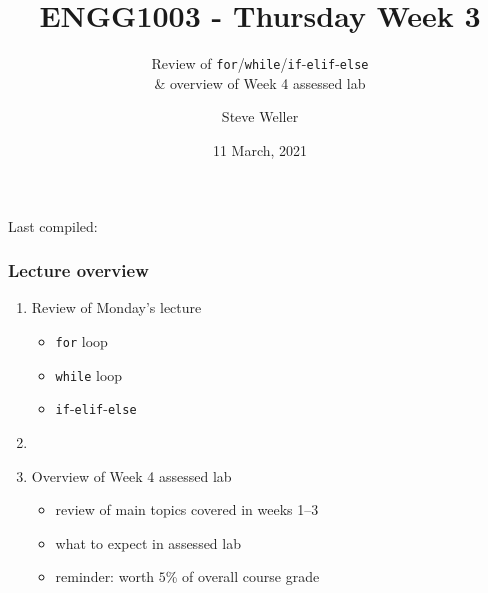\documentclass[english,14pt]{beamer}
\title{ENGG1003 - Thursday Week 3}
\subtitle{Review of \texttt{for}/\texttt{while}/\texttt{if}-\texttt{elif}-\texttt{else} \\ \& overview of Week 4 assessed lab}
\author{Steve Weller}
\institute{University of Newcastle}
\date{11 March, 2021}
\begin{document}
\begin{flushleft}
{\scriptsize Last compiled:~\DTMnow}
\vspace*{-5mm}
\end{flushleft}
\framebreak


\begin{frame}[fragile]

\frametitle{Lecture overview}
\begin{enumerate}
	\item Review of Monday's lecture
		\begin{itemize}
			\item \texttt{for} loop
			\item \texttt{while} loop
			\item \texttt{if}-\texttt{elif}-\texttt{else} 
		\end{itemize}

	\item[]
	
	\item Overview of Week 4 assessed lab
	\begin{itemize}
		\item review of main topics covered in weeks 1--3
		\item what to expect in assessed lab
		\item reminder: worth $5$\% of overall course grade
	\end{itemize}	
						
\end{enumerate}

\end{frame}

\end{document}
